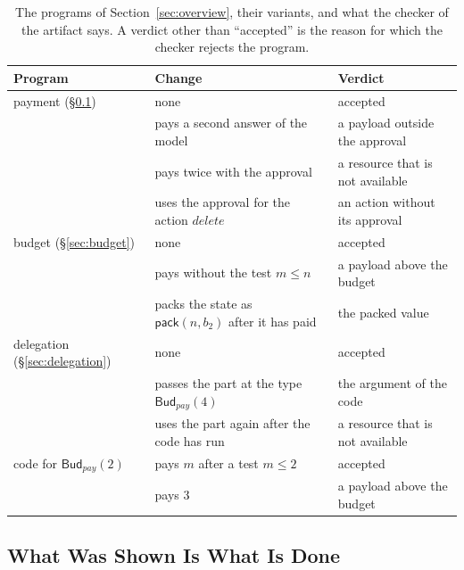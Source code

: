 \documentclass[acmsmall,nonacm,screen]{acmart}
\newcommand{\kw}[1]{\mathsf{#1}}
\newcommand{\nm}[1]{\mathit{#1}}
\newcommand{\Bud}[2]{\kw{Bud}_{#1}(#2)}
\newcommand{\pay}{\nm{pay}}
\newcommand{\pack}[2]{\kw{pack}(#1, #2)}
\begin{document}
\begin{table}[t]
\caption{The programs of Section~\ref{sec:overview}, their variants, and what the checker of
the artifact says. A verdict other than ``accepted'' is the reason for which the checker
rejects the program.}
\label{tab:verdicts}
\small
\begin{tabular}{@{}lll@{}}
\toprule
Program & Change & Verdict \\
\midrule
payment (\S\ref{sec:invoice}) & none & accepted \\
 & pays a second answer of the model & a payload outside the approval \\
 & pays twice with the approval & a resource that is not available \\
 & uses the approval for the action $\nm{delete}$ & an action without its approval \\
budget (\S\ref{sec:budget}) & none & accepted \\
 & pays without the test $m \le n$ & a payload above the budget \\
 & packs the state as $\pack{n}{b_2}$ after it has paid & the packed value \\
delegation (\S\ref{sec:delegation}) & none & accepted \\
 & passes the part at the type $\Bud{\pay}{4}$ & the argument of the code \\
 & uses the part again after the code has run & a resource that is not available \\
code for $\Bud{\pay}{2}$ & pays $m$ after a test $m \le 2$ & accepted \\
 & pays $3$ & a payload above the budget \\
\bottomrule
\end{tabular}
\end{table}

\subsection{What Was Shown Is What Is Done}
\label{sec:invoice}
\end{document}
